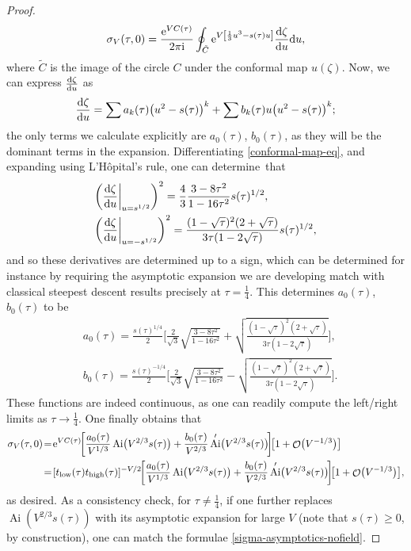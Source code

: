 \documentclass[pdftex]{sigma}
\DeclareMathOperator{\OO}{\mathcal{O}}
\DeclareMathOperator{\Ai}{Ai}
\numberwithin{equation}{section}
\begin{document}
\begin{proof}
\begin{equation*}
 \sigma_V(\tau,0) = \frac{{\rm e}^{V C(\tau)}}{2\pi {\rm i}}\oint_{\tilde{C}} {\rm e}^{V\left[\frac{1}{3} u^3 -s(\tau) u\right]} \frac{{\rm d}\zeta}{{\rm d}u} {\rm d}u,
 \end{equation*}
 where $\tilde{C}$ is the image of the circle $C$ under the conformal map $u(\zeta)$. Now, we can express $\frac{{\rm d}\zeta}{{\rm d}u}$ as
 \begin{equation*}
 \frac{{\rm d}\zeta}{{\rm d}u} = \sum a_k(\tau)\bigl(u^2-s(\tau)\bigr)^k + \sum b_k(\tau)u\bigl(u^2-s(\tau)\bigr)^k;
 \end{equation*}
 the only terms we calculate explicitly are $a_0(\tau)$, $b_0(\tau)$, as they will be the dominant terms in the expansion. Differentiating \eqref{conformal-map-eq}, and expanding using L'H\^{o}pital's rule, one can determine~that
 \begin{align*}
 &\biggl(\frac{{\rm d} \zeta}{{\rm d} u}\bigg|_{u = s^{1/2}}\biggr)^2= \frac{4}{3}\frac{3-8\tau^2}{1-16\tau^2}s(\tau)^{1/2},\\
 &\biggl(\frac{{\rm d} \zeta}{{\rm d} u}\bigg|_{u = -s^{1/2}}\biggr)^2= \frac{(1-\sqrt{\tau})^2(2+\sqrt{\tau})}{3\tau(1-2\sqrt{\tau})}s(\tau)^{1/2},
 \end{align*}
 and so these derivatives are determined up to a sign, which can be determined for instance by requiring the asymptotic expansion we are developing match with classical steepest descent results precisely at $\tau = \frac{1}{4}$. This determines $a_0(\tau)$, $b_0(\tau)$
 to be
 \begin{align*}
 &a_0(\tau)=\frac{s(\tau)^{1/4}}{2}\Biggl[\frac{2}{\sqrt{3}}\sqrt{\frac{3-8\tau^2}{1-16\tau^2}} + \sqrt{\frac{(1-\sqrt{\tau})^2(2+\sqrt{\tau})}{3\tau(1-2\sqrt{\tau})}}\Biggr],\\
 &b_0(\tau)=\frac{s(\tau)^{-1/4}}{2}\Biggl[\frac{2}{\sqrt{3}}\sqrt{\frac{3-8\tau^2}{1-16\tau^2}} - \sqrt{\frac{(1-\sqrt{\tau})^2(2+\sqrt{\tau})}{3\tau(1-2\sqrt{\tau})}}\Biggr].
 \end{align*}
 These functions are indeed continuous, as one can readily compute the left/right limits as $\tau\to\frac{1}{4}$.
 One finally obtains that
 \begin{align*}
 \sigma_V(\tau,0) &\!=\! {\rm e}^{VC(\tau)}\!\biggl[\frac{a_0(\tau)}{V^{1/3}}\Ai\bigl(V^{2/3}s(\tau)\bigr) + \frac{b_0(\tau)}{V^{2/3}}\Ai'\bigl(V^{2/3}s(\tau)\bigr)\!\biggr]\!\bigl[1 + \OO\bigl(V^{-1/3}\bigr)\bigr]\\
 &\!=\![t_{{\rm low}}(\tau)t_{{\rm high}}(\tau)]^{-V/2}\!\biggl[\frac{a_0(\tau)}{V^{1/3}}\Ai\bigl(V^{2/3}s(\tau)\bigr) + \frac{b_0(\tau)}{V^{2/3}}\Ai'\bigl(V^{2/3}s(\tau)\bigr)\!\biggr]\!\bigl[1 + \OO\bigl(V^{-1/3}\bigr)\bigr],
 \end{align*}
 as desired. As a consistency check, for $\tau\neq \frac{1}{4}$, if one further replaces $\Ai(V^{2/3}s(\tau))$ with its asymptotic expansion for large $V$ (note that $s(\tau) \geq 0$, by construction), one can match the formulae \eqref{sigma-asymptotics-nofield}.
\end{proof}
\end{document}
